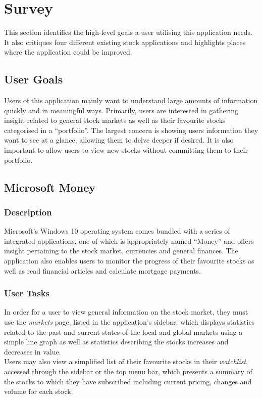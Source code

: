 \documentclass{sigchi}
\begin{document}
\section{Survey}
This section identifies the high-level goals a user utilising this application needs. It also critiques four different existing stock applications and highlights places where the application could be improved.


\subsection{User Goals}
Users of this application mainly want to understand large amounts of information quickly and in meaningful ways. Primarily, users are interested in gathering insight related to general stock markets as well as their favourite stocks categorised in a ``portfolio''. The largest concern is showing users information they want to see at a glance, allowing them to delve deeper if desired. It is also important to allow users to view new stocks without committing them to their portfolio.


\subsection{Microsoft Money}
\subsubsection{Description}
Microsoft's Windows 10 operating system comes bundled with a series of integrated applications, one of which is appropriately named ``Money'' and offers insight pertaining to the stock market, currencies and general finances. The application also enables users to monitor the progress of their favourite stocks as well as read financial articles and calculate mortgage payments.

\subsubsection{User Tasks}
In order for a user to view general information on the stock market, they must use the \textit{markets} page, listed in the application's sidebar, which displays statistics related to the past and current states of the local and global markets using a simple line graph as well as statistics describing the stocks increases and decreases in value. \\
Users may also view a simplified list of their favourite stocks in their \textit{watchlist}, accessed through the sidebar or the top menu bar, which presents a summary of the stocks to which they have subscribed including current pricing, changes and volume for each stock.
\end{document}
